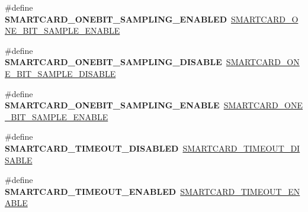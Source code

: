 \begin{DoxyCompactItemize}
\#define {\bfseries S\+M\+A\+R\+T\+C\+A\+R\+D\+\_\+\+O\+N\+E\+B\+I\+T\+\_\+\+S\+A\+M\+P\+L\+I\+N\+G\+\_\+\+E\+N\+A\+B\+L\+ED}~\hyperlink{group___s_m_a_r_t_c_a_r_d___one_bit___sampling_ga16d47e667a1a30513fbee0b05a2e53a6}{S\+M\+A\+R\+T\+C\+A\+R\+D\+\_\+\+O\+N\+E\+\_\+\+B\+I\+T\+\_\+\+S\+A\+M\+P\+L\+E\+\_\+\+E\+N\+A\+B\+LE}
\item 
\mbox{\label{group___h_a_l___s_m_a_r_t_c_a_r_d___aliased___defines_gae2073389fc305d129f5afc0563e6f904}} 
\#define {\bfseries S\+M\+A\+R\+T\+C\+A\+R\+D\+\_\+\+O\+N\+E\+B\+I\+T\+\_\+\+S\+A\+M\+P\+L\+I\+N\+G\+\_\+\+D\+I\+S\+A\+B\+LE}~\hyperlink{group___s_m_a_r_t_c_a_r_d___one_bit___sampling_gabf94d10702dc8b36fe2b3bd04be83863}{S\+M\+A\+R\+T\+C\+A\+R\+D\+\_\+\+O\+N\+E\+\_\+\+B\+I\+T\+\_\+\+S\+A\+M\+P\+L\+E\+\_\+\+D\+I\+S\+A\+B\+LE}
\item 
\mbox{\label{group___h_a_l___s_m_a_r_t_c_a_r_d___aliased___defines_ga6b1003bcf592f95747053f3413b99c56}} 
\#define {\bfseries S\+M\+A\+R\+T\+C\+A\+R\+D\+\_\+\+O\+N\+E\+B\+I\+T\+\_\+\+S\+A\+M\+P\+L\+I\+N\+G\+\_\+\+E\+N\+A\+B\+LE}~\hyperlink{group___s_m_a_r_t_c_a_r_d___one_bit___sampling_ga16d47e667a1a30513fbee0b05a2e53a6}{S\+M\+A\+R\+T\+C\+A\+R\+D\+\_\+\+O\+N\+E\+\_\+\+B\+I\+T\+\_\+\+S\+A\+M\+P\+L\+E\+\_\+\+E\+N\+A\+B\+LE}
\item 
\mbox{\label{group___h_a_l___s_m_a_r_t_c_a_r_d___aliased___defines_ga210ac6ce433eba815aa4f60c28585cef}} 
\#define {\bfseries S\+M\+A\+R\+T\+C\+A\+R\+D\+\_\+\+T\+I\+M\+E\+O\+U\+T\+\_\+\+D\+I\+S\+A\+B\+L\+ED}~\hyperlink{group___s_m_a_r_t_c_a_r_d___timeout___enable_ga0ba20486fc3bcc8e5af29c93a6a8cf59}{S\+M\+A\+R\+T\+C\+A\+R\+D\+\_\+\+T\+I\+M\+E\+O\+U\+T\+\_\+\+D\+I\+S\+A\+B\+LE}
\item 
\mbox{\label{group___h_a_l___s_m_a_r_t_c_a_r_d___aliased___defines_ga9b647335af6422a6e012aceb7c82cfdb}} 
\#define {\bfseries S\+M\+A\+R\+T\+C\+A\+R\+D\+\_\+\+T\+I\+M\+E\+O\+U\+T\+\_\+\+E\+N\+A\+B\+L\+ED}~\hyperlink{group___s_m_a_r_t_c_a_r_d___timeout___enable_gafe265eb057a328f79f45394e1d5f6655}{S\+M\+A\+R\+T\+C\+A\+R\+D\+\_\+\+T\+I\+M\+E\+O\+U\+T\+\_\+\+E\+N\+A\+B\+LE}
\item 
\mbox{\label{group___h_a_l___s_m_a_r_t_c_a_r_d___aliased___defines_ga1e078e6865628a2967aac6ade7be429e}} 

\end{DoxyCompactItemize}
